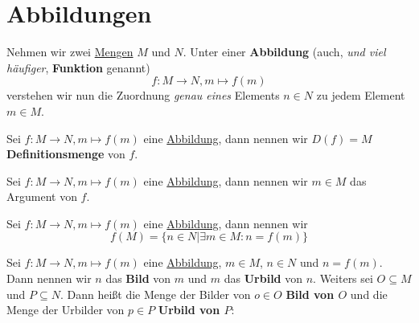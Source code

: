 \documentclass[../../main.tex]{subfiles}
\begin{document}
	\chapter{Abbildungen}
	\label{chap:Abbildungen}

	\begin{definition}
		\label{def:Abbildung}
		\label{def:Funktion}
		Nehmen wir zwei \hyperref[def:Menge]{Mengen} $M$ und $N$. Unter einer \textbf{Abbildung} (auch, \textit{und viel häufiger}, \textbf{Funktion} genannt) $$f: M \rightarrow N, m \mapsto f(m)$$ verstehen wir nun die Zuordnung \textit{genau eines} Elements $n \in N$ zu jedem Element $m\in M$.
	\end{definition}

	\begin{definition}[Definitionsmenge]
		\label{def:Definitionsmenge}
		Sei $f: M \rightarrow N, m \mapsto f(m)$ eine \hyperref[def:Abbildung]{Abbildung}, dann nennen wir $D(f) = M$ \textbf{Definitionsmenge} von $f$.
	\end{definition}

	\begin{definition}[Argument]
		\label{def:Argument}
		Sei $f: M \rightarrow N, m \mapsto f(m)$ eine \hyperref[def:Abbildung]{Abbildung}, dann nennen wir $m \in M$ das Argument von $f$.
	\end{definition}

	\begin{definition}[Bildmenge]
		\label{def:Bildmenge}
		Sei $f: M \rightarrow N, m \mapsto f(m)$ eine \hyperref[def:Abbildung]{Abbildung}, dann nennen wir $$f(M) = \{n \in N | \exists m \in M: n=f(m)   \}$$
	\end{definition}

	\begin{definition}
		\label{def:Bild}
		\label{def:Urbild}
		Sei $f: M \rightarrow N, m \mapsto f(m)$ eine \hyperref[def:Abbildung]{Abbildung}, $m \in M$, $n \in N$ und $n = f(m)$. Dann nennen wir $n$ das \textbf{Bild} von $m$ und $m$ das \textbf{Urbild} von $n$. Weiters sei $O \subseteq M$ und $P \subseteq N$. Dann heißt die Menge der Bilder von $o \in O$ \textbf{Bild von $O$} und die Menge der Urbilder von $p \in P$ \textbf{Urbild von $P$}: 
	\end{definition}
\end{document}

